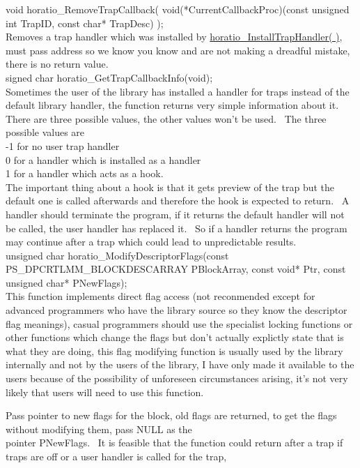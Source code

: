 \documentclass{article}
\begin{document}
void horatio\_RemoveTrapCallback(
void(*CurrentCallbackProc)(const
unsigned int TrapID, const char* TrapDesc) );
\\
Removes a trap handler which was installed by \href{#InstallTrapCallback}{horatio\_InstallTrapHandler(
)}, must pass address so we know you know and are not making a
dreadful
mistake, there is no return value.
\\
signed char horatio\_GetTrapCallbackInfo(void);
\\
Sometimes the user of the library has installed a handler for traps
instead of the default library handler, the function returns very
simple
information about it.~ There are three possible values, the other
values won't be used.~ The three possible values are
\\
-1 for no user trap handler
\\
0 for a handler which is installed as a handler
\\
1 for a handler which acts as a hook.
\\
The important thing about a hook is that it gets preview of the trap
but the default one is called afterwards and therefore the hook is
expected
to return.~ A handler should terminate the program, if it returns
the default handler will not be called, the user handler has replaced
it.~
So if a handler returns the program may continue after a trap which
could
lead to unpredictable results.
\\
unsigned char
horatio\_ModifyDescriptorFlags(const
PS\_DPCRTLMM\_BLOCKDESCARRAY PBlockArray, const void* Ptr, const unsigned
char* PNewFlags);
\\
This function implements direct flag access (not reconmended except
for advanced programmers who have the library source so they know the
descriptor
flag meanings), casual programmers should use the specialist locking
functions
or other functions which change the flags but don't actually explictly
state that is what they are doing, this flag modifying function is
usually
used by the library internally and not by the users of the library, I
have
only made it available to the users because of the possibility of
unforeseen
circumstances arising, it's not very likely that users will need to use
this function.
\par Pass pointer to new flags for the block, old flags are returned, to
get the flags without modifying them, pass NULL as the
\\
pointer PNewFlags.~ It is feasible that the function could return
after a trap if traps are off or a user handler is called for the trap,
\end{document}
